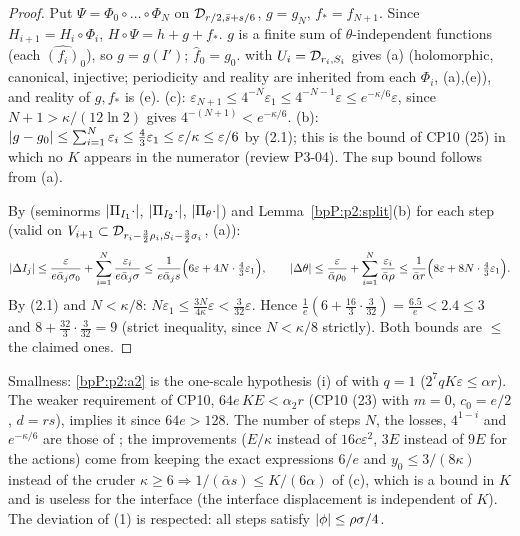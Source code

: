 \begin{proof}
\label{stepP:p2:nfb-concl} Put $\Psi=\Phi_0\circ\dots\circ\Phi_N$ on $\mathcal D_{r/2,\bar s+s/6}$, $g=g_N$, $f_*=f_{N+1}$. Since $H_{i+1}=H_i\circ\Phi_i$, $H\circ\Psi=h+g+f_*$. $g$ is a finite sum of $\theta$-independent functions (each $\hat{(f_i)}_0$), so $g=g(I')$; $\hat f_0=g_0$.  with $U_i=\mathcal D_{r_i,S_i}$ gives (a) (holomorphic, canonical, injective; periodicity and reality are inherited from each $\Phi_i$, (a),(e)), and reality of $g,f_*$ is (e).
(c): $\varepsilon_{N+1}\le4^{-N}\varepsilon_1\le4^{-N-1}\varepsilon\le e^{-\kappa/6}\varepsilon$, since $N+1>\kappa/(12\ln2)$ gives $4^{-(N+1)}<e^{-\kappa/6}$.
(b): $\lvert g-g_0\rvert\le\sum_{i=1}^N\varepsilon_i\le\frac43\varepsilon_1\le\varepsilon/\kappa\le\varepsilon/6$ by (2.1); this is the bound of CP10 (25) in which no $K$ appears in the numerator (review P3-04). The sup bound follows from (a).

\label{stepP:p2:nfb-disp} By  (seminorms $\lvert \Pi_{I_1}\cdot\rvert$, $\lvert \Pi_{I_2}\cdot\rvert$, $\lvert \Pi_\theta\cdot\rvert$) and Lemma~\ref{bpP:p2:split}(b) for each step (valid on $V_{i+1}\subset\mathcal D_{r_i-\frac32\rho_i,S_i-\frac32\sigma_i}$, (a)):
\[\lvert \Delta I_j\rvert\le\frac{\varepsilon}{e\bar\alpha_j\sigma_0}+\sum_{i=1}^N\frac{\varepsilon_i}{e\bar\alpha_j\sigma}\le\frac1{e\bar\alpha_js}\Bigl(6\varepsilon+4N\cdot\tfrac43\varepsilon_1\Bigr),\qquad
\lvert \Delta\theta\rvert\le\frac\varepsilon{\bar\alpha\rho_0}+\sum_{i=1}^N\frac{\varepsilon_i}{\bar\alpha\rho}\le\frac1{\bar\alpha r}\Bigl(8\varepsilon+8N\cdot\tfrac43\varepsilon_1\Bigr).\]
By (2.1) and $N<\kappa/8$: $N\varepsilon_1\le\frac{3N}{4\kappa}\varepsilon<\frac3{32}\varepsilon$. Hence $\frac{1}{e}(6+\frac{16}3\cdot\frac3{32})=\frac{6.5}e<2.4\le3$ and $8+\frac{32}3\cdot\frac3{32}=9$ (strict inequality, since $N<\kappa/8$ strictly). Both bounds are $\le$ the claimed ones.
\end{proof}

\begin{remark}\label{bpP:p2:nums}
Smallness: \ref{bpP:p2:a2} is the one-scale hypothesis (i) of  with $q=1$ ($2^7qK\varepsilon\le\alpha r$). The weaker requirement of CP10, $64e\,KE<\alpha_2r$ (CP10 (23) with $m=0$, $c_0=e/2$, $d=rs$), implies it since $64e>128$. The number of steps $N$, the losses, $4^{1-i}$ and $e^{-\kappa/6}$ are those of ; the improvements ($E/\kappa$ instead of $16c\varepsilon^2$, $3E$ instead of $9E$ for the actions) come from keeping the exact expressions $6/e$ and $y_0\le3/(8\kappa)$ instead of the cruder $\kappa\ge6\Rightarrow1/(\bar\alpha s)\le K/(6\alpha)$ of (c), which is a bound in $K$ and is useless for the interface (the interface displacement is independent of $K$).
The deviation of (1) is respected: all steps satisfy $\lvert \phi\rvert\le\rho\sigma/4$.
\end{remark}

